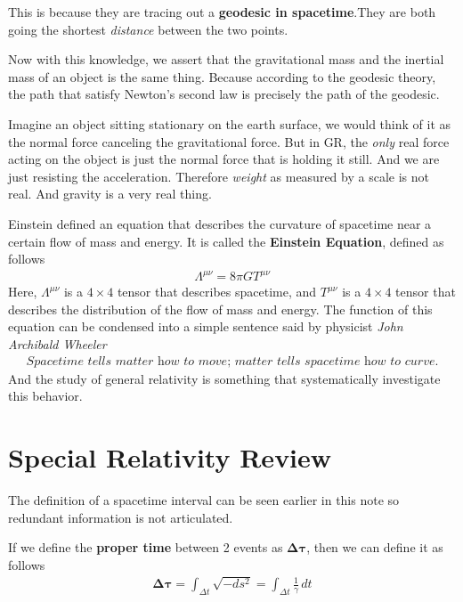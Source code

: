 \documentclass[12pt]{book}
\begin{document}
This is because they are tracing out a \textbf{geodesic in spacetime}.They are both going the shortest \textit{distance} between the two points. 

Now with this knowledge, we assert that the gravitational mass and the inertial mass of an object is the same thing. Because according to the geodesic theory, the path that satisfy Newton's second law is precisely the path of the geodesic. 

Imagine an object sitting stationary on the earth surface, we would think of it as the normal force canceling the gravitational force. But in GR, the \textit{only} real force acting on the object is just the normal force that is holding it still. And we are just resisting the acceleration. Therefore \textit{weight} as measured by a scale is not real. And gravity is a very real thing. 

Einstein defined an equation that describes the curvature of spacetime near a certain flow of mass and energy. It is called the \textbf{Einstein Equation}, defined as follows
\begin{align}
\Lambda^{\mu\nu} = 8\pi GT^{\mu\nu}
\end{align}
Here, $\Lambda^{\mu\nu}$ is a $4\times4$ tensor that describes spacetime, and $T^{\mu\nu}$ is a $4\times4$ tensor that describes the distribution of the flow of mass and energy. The function of this equation can be condensed into a simple sentence said by physicist \textit{John Archibald Wheeler}
\begin{align}
\textit{Spacetime tells matter how to move; matter tells spacetime how to curve.}
\end{align}
And the study of general relativity is something that systematically investigate this behavior. 


\section{Special Relativity Review}
The definition of a spacetime interval can be seen earlier in this note so redundant information is not articulated. 

If we define the \textbf{proper time} between 2 events as $\boldsymbol\Delta\boldsymbol\tau$, then we can define it as follows
\begin{align}
\boldsymbol\Delta\boldsymbol\tau = \int_{\Delta t }\sqrt{-ds^2} =\int_{\Delta t} \frac{1}{\gamma}\,dt
\end{align}
\end{document}
